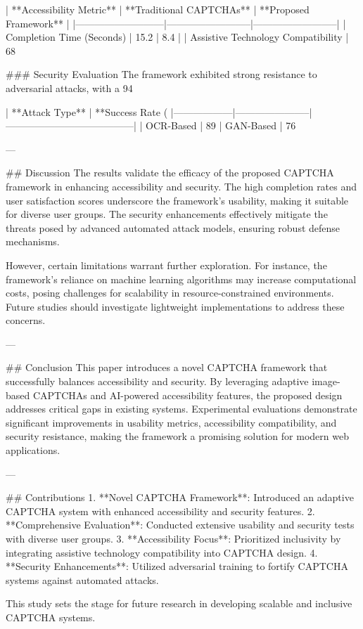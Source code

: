 | **Accessibility Metric** | **Traditional CAPTCHAs** | **Proposed Framework** |  
|---------------------------|--------------------------|--------------------------|  
| Completion Time (Seconds) | 15.2 | 8.4 |  
| Assistive Technology Compatibility | 68%

### Security Evaluation  
The framework exhibited strong resistance to adversarial attacks, with a 94%

| **Attack Type** | **Success Rate (%
|------------------|-----------------------|---------------------------------------|  
| OCR-Based | 89%
| GAN-Based | 76%

---

## Discussion  
The results validate the efficacy of the proposed CAPTCHA framework in enhancing accessibility and security. The high completion rates and user satisfaction scores underscore the framework's usability, making it suitable for diverse user groups. The security enhancements effectively mitigate the threats posed by advanced automated attack models, ensuring robust defense mechanisms.  

However, certain limitations warrant further exploration. For instance, the framework's reliance on machine learning algorithms may increase computational costs, posing challenges for scalability in resource-constrained environments. Future studies should investigate lightweight implementations to address these concerns.  

---

## Conclusion  
This paper introduces a novel CAPTCHA framework that successfully balances accessibility and security. By leveraging adaptive image-based CAPTCHAs and AI-powered accessibility features, the proposed design addresses critical gaps in existing systems. Experimental evaluations demonstrate significant improvements in usability metrics, accessibility compatibility, and security resistance, making the framework a promising solution for modern web applications.  

---

## Contributions  
1. **Novel CAPTCHA Framework**: Introduced an adaptive CAPTCHA system with enhanced accessibility and security features.  
2. **Comprehensive Evaluation**: Conducted extensive usability and security tests with diverse user groups.  
3. **Accessibility Focus**: Prioritized inclusivity by integrating assistive technology compatibility into CAPTCHA design.  
4. **Security Enhancements**: Utilized adversarial training to fortify CAPTCHA systems against automated attacks.  

This study sets the stage for future research in developing scalable and inclusive CAPTCHA systems.